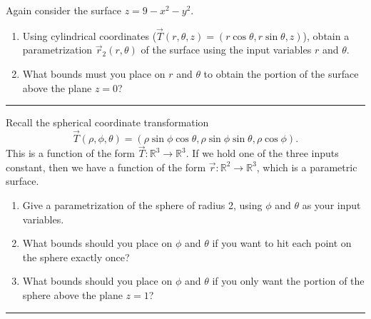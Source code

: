 \begin{problem}%
%
 Again consider the surface $z=9-x^2-y^2$.
\begin{enumerate}
 \item
Using cylindrical coordinates ($\vec T(r,\theta,z) = (r\cos \theta, r\sin\theta, z)$), obtain a parametrization $\vec r_2(r,\theta)$ of the surface using the input variables $r$ and $\theta$.  
 \item What bounds must you place on $r$ and $\theta$ to obtain the portion of the surface above the plane $z=0$?
\end{enumerate}

\hrule\end{problem}


\begin{problem}%
Recall the spherical coordinate transformation 
$$\vec T(\rho,\phi,\theta) = (\rho\sin\phi\cos \theta, \rho\sin\phi\sin \theta,\rho \cos \phi).$$ 
This is a function of the form $\vec T:\mathbb{R}^3\to\mathbb{R}^3$.  If we hold one of the three inputs constant, then we have a function of the form $\vec r:\mathbb{R}^2\to\mathbb{R}^3$, which is a parametric surface.
\begin{enumerate}
 \item {}%
Give a parametrization of the sphere of radius 2, using $\phi$ and $\theta$ as your input variables. 
 \item What bounds should you place on $\phi$ and $\theta$ if you want to hit each point on the sphere exactly once?
 \item What bounds should you place on $\phi$ and $\theta$ if you only want the portion of the sphere above the plane $z=1$?
\end{enumerate}
\hrule\end{problem}

